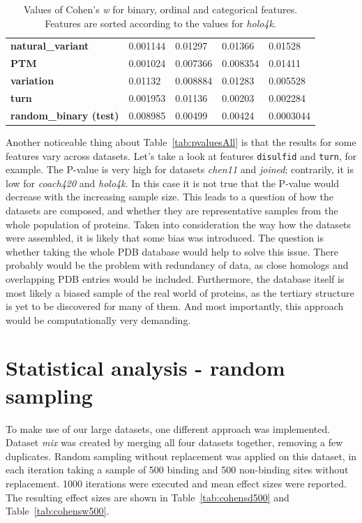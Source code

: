 \begin{table}[]
\begin{tabular}{@{}lllll@{}}
\textbf{natural\_variant}     & 0.001144        & 0.01297           & 0.01366         & 0.01528         \\
\textbf{PTM}                  & 0.001024        & 0.007366          & 0.008354        & 0.01411         \\
\textbf{variation}            & 0.01132         & 0.008884          & 0.01283         & 0.005528        \\
\textbf{turn}                 & 0.001953        & 0.01136           & 0.00203         & 0.002284        \\
\textbf{random\_binary (test)}       & 0.008985        & 0.00499           & 0.00424         & 0.0003044       \\ \bottomrule
\end{tabular}
\caption[Values of Cohen's \textit{w}]{Values of Cohen's \textit{w} for binary, ordinal and categorical features. Features are sorted according to the values for \textit{holo4k}.}
\label{tab:cohensw}
\end{table}

Another noticeable thing about Table~\ref{tab:pvaluesAll} is that the results for some features vary across datasets. Let's take a look at features \texttt{disulfid} and \texttt{turn}, for example. The P-value is very high for datasets \textit{chen11} and \textit{joined}; contrarily, it is low for \textit{coach420} and \textit{holo4k}. In this case it is not true that the P-value would decrease with the increasing sample size. This leads to a question of how the datasets are composed, and whether they are representative samples from the whole population of proteins. Taken into consideration the way how the datasets were assembled, it is likely that some bias was introduced. The question is whether taking the whole PDB database would help to solve this issue. There probably would be the problem with redundancy of data, as close homologs and overlapping PDB entries would be included. Furthermore, the database itself is most likely a biased sample of the real world of proteins, as the tertiary structure is yet to be discovered for many of them. And most importantly, this approach would be computationally very demanding.

\newpage
\section{Statistical analysis - random sampling}

To make use of our large datasets, one different approach was implemented. Dataset \textit{mix} was created by merging all four datasets together, removing a few duplicates. Random sampling without replacement was applied on this dataset, in each iteration taking a sample of 500 binding and 500 non-binding sites without replacement. 1000 iterations were executed and mean effect sizes were reported. The resulting effect sizes are shown in Table~\ref{tab:cohensd500} and Table~\ref{tab:cohensw500}.

